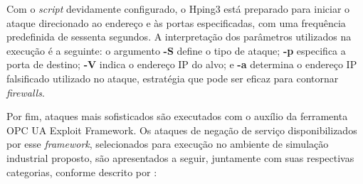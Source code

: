         Com o \textit{script} devidamente configurado, o Hping3 está preparado para iniciar o ataque direcionado ao endereço e às portas especificadas, com uma frequência predefinida de sessenta segundos. A interpretação dos parâmetros utilizados na execução é a seguinte: o argumento \textbf{-S} define o tipo de ataque; \textbf{-p} especifica a porta de destino; \textbf{-V} indica o endereço IP do alvo; e \textbf{-a} determina o endereço IP falsificado utilizado no ataque, estratégia que pode ser eficaz para contornar \textit{firewalls}.

        Por fim, ataques mais sofisticados são executados com o auxílio da ferramenta OPC UA Exploit Framework. Os ataques de negação de serviço disponibilizados por esse \textit{framework}, selecionados para execução no ambiente de simulação industrial proposto, são apresentados a seguir, juntamente com suas respectivas categorias, conforme descrito por :

